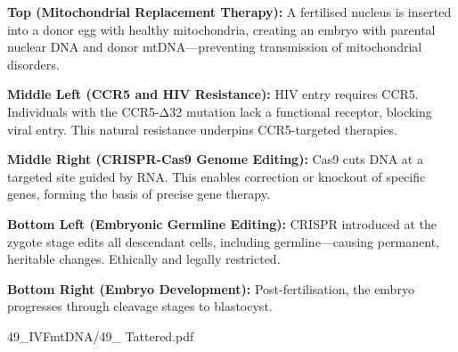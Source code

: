 \begin{SideNotePage}{
  \textbf{Top (Mitochondrial Replacement Therapy):}  
  A fertilised nucleus is inserted into a donor egg with healthy mitochondria, creating an embryo with parental nuclear DNA and donor mtDNA—preventing transmission of mitochondrial disorders. \par

  \textbf{Middle Left (CCR5 and HIV Resistance):}  
  HIV entry requires CCR5. Individuals with the CCR5-Δ32 mutation lack a functional receptor, blocking viral entry. This natural resistance underpins CCR5-targeted therapies. \par

  \textbf{Middle Right (CRISPR-Cas9 Genome Editing):}  
  Cas9 cuts DNA at a targeted site guided by RNA. This enables correction or knockout of specific genes, forming the basis of precise gene therapy. \par

  \textbf{Bottom Left (Embryonic Germline Editing):}  
  CRISPR introduced at the zygote stage edits all descendant cells, including germline—causing permanent, heritable changes. Ethically and legally restricted. \par

  \textbf{Bottom Right (Embryo Development):}  
  Post-fertilisation, the embryo progresses through cleavage stages to blastocyst. \par
}{49_IVFmtDNA/49_ Tattered.pdf}
\end{SideNotePage}
